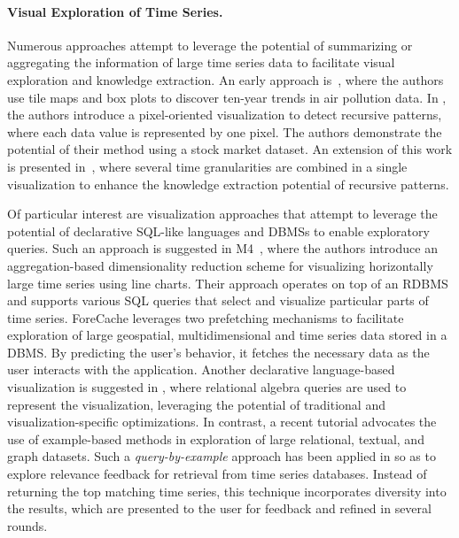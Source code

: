 \paragraph{Visual Exploration of Time Series.} Numerous approaches attempt to leverage the potential of summarizing or aggregating the information of large time series data to facilitate visual exploration and knowledge extraction. An early approach is~\cite{mintz1997tracking}, where the authors use tile maps and box plots to discover ten-year trends in air pollution data. In \cite{keim1995recursive}, the authors introduce a pixel-oriented visualization to detect recursive patterns, where each data value is represented by one pixel. The authors demonstrate the potential of their method using a stock market dataset. An extension of this work is presented in~\cite{lammarsch2009hierarchical}, where several time granularities are combined in a single visualization to enhance the knowledge extraction potential of recursive patterns. 

Of particular interest are visualization approaches that attempt to leverage the potential of declarative SQL-like languages and DBMSs to enable exploratory queries. Such an approach is suggested in M4~\cite{jugel2014m4}, where the authors introduce an aggregation-based dimensionality reduction scheme for visualizing horizontally large time series using line charts. Their approach operates on top of an RDBMS and supports various SQL queries that select and visualize particular parts of time series. ForeCache \cite{battle2016sigmod} leverages two prefetching mechanisms to facilitate exploration of large geospatial, multidimensional and time series data stored in a DBMS. By predicting the user's behavior, it fetches the necessary data as the user interacts with the application. Another declarative language-based visualization is suggested in \cite{wu2014vldb}, where relational algebra queries are used to represent the visualization, leveraging the potential of traditional and visualization-specific optimizations. In contrast, a recent tutorial \cite{mottin2017vldb} advocates the use of example-based methods in exploration of large relational, textual, and graph datasets. Such a {\em query-by-example} approach has been applied in \cite{eravci2013vldb} so as to explore relevance feedback for retrieval from time series databases. Instead of returning the top matching time series, this technique incorporates diversity into the results, which are presented to the user for feedback and refined in several rounds.


